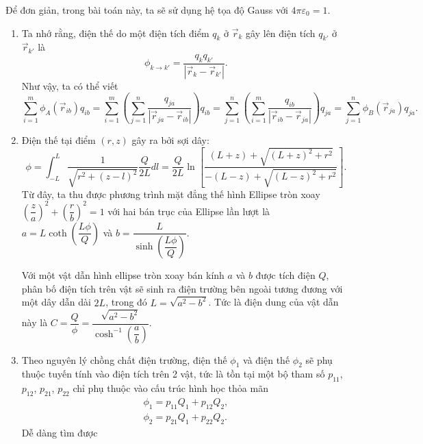 Để đơn giản, trong bài toán này, ta sẽ sử dụng hệ tọa độ Gauss với $4 \pi \varepsilon_0 = 1$.
\begin{enumerate}
    \item Ta nhớ rằng, điện thế do một điện tích điểm $q_k$ ở $\Vec{r}_k$ gây lên điện tích $q_{k'}$ ở $\Vec{r}_{k'}$ là
    \begin{equation}
        \phi_{k \rightarrow k'} = \dfrac{q_k q_{k'}}{ \left| \Vec{r}_k - \Vec{r}_{k'} \right|}.
    \end{equation}
    Như vậy, ta có thể viết
    \begin{equation}
        \sum_{i=1}^m \phi_A (\Vec{r}_{ib}) q_{ib} 
        = \sum_{i=1}^m \left( \sum_{j=1}^n \dfrac{q_{ja}}{ \left| \Vec{r}_{ja} - \Vec{r}_{ib} \right| } \right) q_{ib} 
        = \sum_{j=1}^n \left( \sum_{i=1}^m \dfrac{q_{ib}}{ \left| \Vec{r}_{ib} - \Vec{r}_{ja} \right| } \right) q_{ja} 
        = \sum_{j=1}^n \phi_B (\Vec{r}_{ja}) q_{ja}.
    \end{equation}
    \item Điện thế tại điểm $(r,z)$ gây ra bởi sợi dây:
    \begin{equation}
        \phi = \int_{-L}^{L} \dfrac{1}{\sqrt{r^2+(z-l)^2}} \dfrac{Q}{2L} dl = \dfrac{Q}{2L} \ln \left[ \dfrac{ \left( L + z \right) + \sqrt{\left( L + z \right)^2+r^2} }{ -\left( L - z \right) + \sqrt{\left( L - z \right)^2+r^2} } \right].
    \end{equation}
    Từ đây, ta thu được phương trình mặt đẳng thế hình Ellipse tròn xoay $ \left( \dfrac{z}{a} \right)^2 + \left( \dfrac{r}{b} \right)^2 = 1$ với hai bán trục của Ellipse lần lượt là $a = L \coth \left( \dfrac{L \phi}{Q} \right)$ và $b = \dfrac{L}{ \sinh \left( \dfrac{L \phi}{Q} \right)}$.

    Với một vật dẫn hình ellipse tròn xoay bán kính $a$ và $b$ được tích điện $Q$, phân bố điện tích trên vật sẽ sinh ra điện trường bên ngoài tương đương với một dây dẫn dài $2L$, trong đó $L=\sqrt{a^2-b^2}$. Tức là điện dung của vật dẫn này là $C=\dfrac{Q}{\phi} = \dfrac{\sqrt{a^2-b^2}}{ \cosh^{-1} \left( \dfrac{a}{b} \right)}$.

    \item Theo nguyên lý chồng chất điện trường, điện thế $\phi_1$ và điện thế $\phi_2$ sẽ phụ thuộc tuyến tính vào điện tích trên 2 vật, tức là tồn tại một bộ tham số $p_{11}$, $p_{12}$, $p_{21}$, $p_{22}$ chỉ phụ thuộc vào cấu trúc hình học thỏa mãn
    \begin{align*}
        \phi_1 = p_{11} Q_1 + p_{12} Q_2, \\
        \phi_2 = p_{21} Q_1 + p_{22} Q_2.
    \end{align*}
    Dễ dàng tìm được
\end{enumerate}